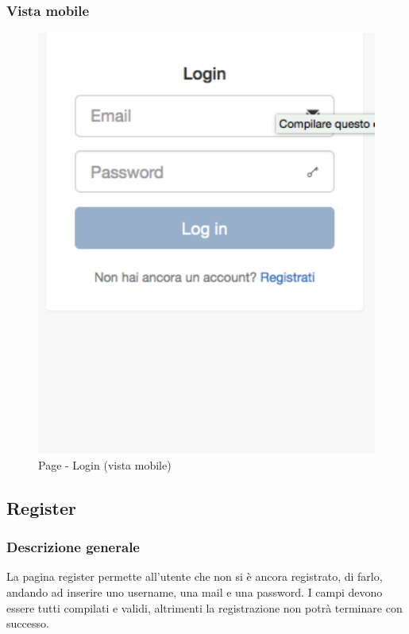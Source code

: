 		\subsubsection{Vista mobile} %
		\begin{figure}[htbp]
			\centering
			\centerline{\includegraphics[scale=0.5]{./images/mockup/login_vm.pdf}}
			\caption{Page - Login (vista mobile)}
		\end{figure}

	\subsection{Register} %
	\label{sub:register}
		\subsubsection{Descrizione generale} %
		La pagina register permette all'utente che non si è ancora registrato, di farlo, andando ad inserire uno username, una mail e una password. I campi devono essere tutti compilati e validi, altrimenti la registrazione non potrà terminare con successo.

